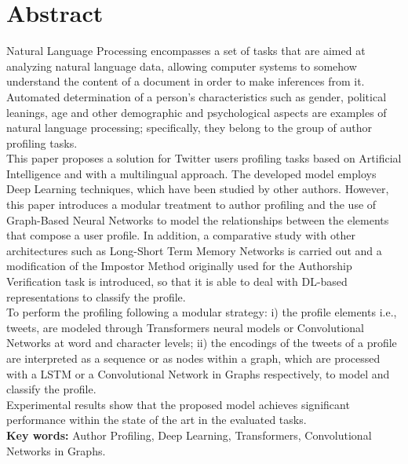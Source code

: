 \chapter*{Abstract}

Natural Language Processing encompasses a set of tasks that are aimed at analyzing natural language data, allowing computer systems to somehow understand the content of a document in order to make inferences from it. Automated determination of a person's characteristics such as gender, political leanings, age and other demographic and psychological aspects are examples of natural language processing; specifically, they belong to the group of author profiling tasks.
\\
This paper proposes a solution for Twitter users profiling tasks based on Artificial Intelligence and with a multilingual approach. The developed model employs Deep Learning techniques, which have been studied by other authors. However, this paper introduces a modular treatment to author profiling and the use of Graph-Based Neural Networks to model the relationships between the elements that compose a user profile. In addition, a comparative study with other architectures such as Long-Short Term Memory Networks is carried out and a modification of the Impostor Method originally used for the Authorship Verification task is introduced, so that it is able to deal with DL-based representations to classify the profile.
\\
To perform the profiling following a modular strategy: i) the profile elements i.e., tweets, are modeled through Transformers neural models or Convolutional Networks at word and character levels; ii) the encodings of the tweets of a profile are interpreted as a sequence or as nodes within a graph, which are processed with a LSTM or a Convolutional Network in Graphs respectively, to model and classify the profile.\\ Experimental results show that the proposed model achieves significant performance within the state of the art in the evaluated tasks.
\\


\textbf{Key words:} Author Profiling, Deep Learning, Transformers, Convolutional Networks in Graphs.

